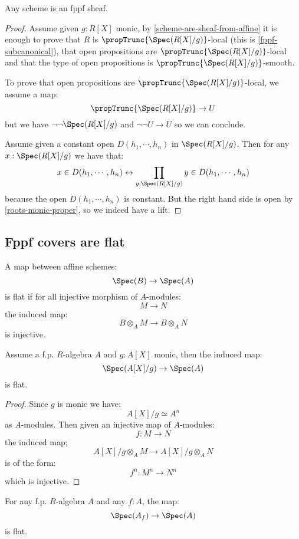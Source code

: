 \begin{proposition}\label{schemes-are-fppf-sheaves}
Any scheme is an fppf sheaf.
\end{proposition}

\begin{proof}
Assume given $g:R[X]$ monic, by \cref{scheme-are-sheaf-from-affine} it is enough to prove that $R$ is $\propTrunc{\Spec(R[X]/g)}$-local (this is \cref{fppf-subcanonical}), that open propositions are $\propTrunc{\Spec(R[X]/g)}$-local and that the type of open propositions is $\propTrunc{\Spec(R[X]/g)}$-smooth. 

To prove that open propositions are $\propTrunc{\Spec(R[X]/g)}$-local, we assume a map:
\[\propTrunc{\Spec(R[X]/g)} \to U\]
but we have $\neg\neg\Spec(R[X]/g)$ and $\neg\neg U\to U$ so we can conclude.

Assume given a constant open $D(h_1,\cdots,h_n)$ in $\Spec(R[X]/g)$. Then for any $x:\Spec(R[X]/g)$ we have that:
\[x\in D(h_1,\cdots,h_n) \leftrightarrow \prod_{y:\Spec(R[X]/g)} y\in D(h_1,\cdots,h_n)\]
because the open $D(h_1,\cdots,h_n)$ is constant. But the right hand side is open by \cref{roots-monic-proper}, so we indeed have a lift.
\end{proof}

\subsection{Fppf covers are flat}

\begin{definition}
A map between affine schemes:
\[\Spec(B)\to \Spec(A)\]
is flat if for all injective morphism of $A$-modules: 
\[M\to N\]
the induced map:
\[B\otimes_A M \to B\otimes_A N\]
is injective.
\end{definition}

\begin{lemma}\label{root-monic-flat}
Assume a f.p. $R$-algebra $A$ and $g:A[X]$ monic, then the induced map:
\[\Spec(A[X]/g)\to \Spec(A)\]
is flat.
\end{lemma}

\begin{proof}
Since $g$ is monic we have:
\[A[X]/g\simeq A^n\]
as $A$-modules. Then given an injective map of $A$-modules:
\[f:M\to N\]
the induced map;
\[A[X]/g\otimes_AM \to A[X]/g\otimes_AN\]
is of the form:
\[f^n:M^n\to N^n\]
which is injective.
\end{proof}

\begin{lemma}\label{localisation-is-flat}
For any f.p. $R$-algebra $A$ and any $f:A$, the map:
\[\Spec(A_f)\to\Spec(A)\]
is flat.
\end{lemma}

